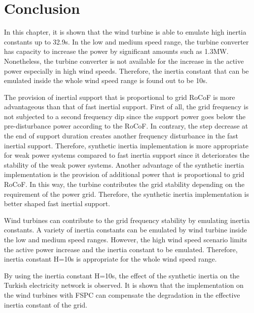 \section{Conclusion}
In this chapter, it is shown that the wind turbine is able to emulate high inertia constants up to 32.9s. In the low and medium speed range, the turbine converter has capacity to increase the power by significant amounts such as 1.3MW. Nonetheless, the turbine converter is not available for the increase in the active power especially in high wind speeds. Therefore, the inertia constant that can be emulated inside the whole wind speed range is found out to be 10s. \par
The provision of inertial support that is proportional to grid RoCoF is more advantageous than that of fast inertial support. First of all, the grid frequency is not subjected to a second frequency dip since the support power goes below the pre-disturbance power according to the RoCoF. In contrary, the step decrease at the end of support duration creates another frequency disturbance in the fast inertial support. Therefore, synthetic inertia implementation is more appropriate for weak power systems compared to fast inertia support since it deteriorates the stability of the weak power systems. Another advantage of the synthetic inertia implementation is the provision of additional power that is proportional to grid RoCoF. In this way, the turbine contributes the grid stability depending on the requirement of the power grid. Therefore, the synthetic inertia implementation is better shaped fast inertial support.\par
Wind turbines can contribute to the grid frequency stability by emulating inertia constants. A variety of inertia constants can be emulated by wind turbine inside the low and medium speed ranges. However, the high wind speed scenario limits the active power increase and the inertia constant to be emulated. Therefore, inertia constant H=10s is appropriate for the whole wind speed range.\par
By using the inertia constant H=10s, the effect of the synthetic inertia on the Turkish electricity network is observed. It is shown that the implementation on the wind turbines with FSPC can compensate the degradation in the effective inertia constant of the grid.